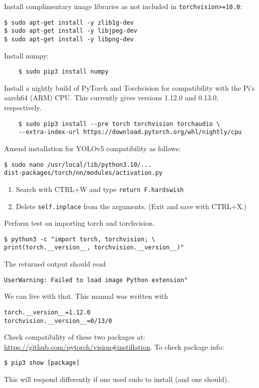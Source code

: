 \documentclass[12pt, a4paper, oneside]{article}
\begin{document}
Install complimentary image libraries as not included in \texttt{torchvision>=10.0}:
\begin{verbatim}
$ sudo apt-get install -y zlib1g-dev
$ sudo apt-get install -y libjpeg-dev
$ sudo apt-get install -y libpng-dev
\end{verbatim}
Install numpy:
\begin{verbatim}
	$ sudo pip3 install numpy
\end{verbatim}
Install a nightly build of PyTorch and Torchvision for compatibility with the Pi's aarch64 (ARM) CPU. This currently gives versions 1.12.0 and 0.13.0, respectively.
\begin{verbatim}
	$ sudo pip3 install --pre torch torchvision torchaudio \
	--extra-index-url https://download.pytorch.org/whl/nightly/cpu
\end{verbatim}
Amend installation for YOLOv5 compatibility as follows:
\begin{verbatim}
$ sudo nano /usr/local/lib/python3.10/...
dist-packages/torch/nn/modules/activation.py
\end{verbatim}
\begin{enumerate}
\item
Search with CTRL+W and type \texttt{return F.hardswish}
\item
Delete \texttt{self.inplace} from the arguments. (Exit and save with CTRL+X.)
\end{enumerate}
Perform test on importing torch and torchvision.
\begin{verbatim}
$ python3 -c "import torch, torchvision; \
print(torch.__version__, torchvision.__version__)"
\end{verbatim}
The returned output should read
\begin{verbatim}
UserWarning: Failed to load image Python extension"
\end{verbatim}
We can live with that. This manual was written with
\begin{verbatim}
torch.__version__=1.12.0
torchvision.__version__=0/13/0
\end{verbatim}
Check compatibility of these two packages at: \url{https://github.com/pytorch/vision#instillation}.
To check package info:
\begin{verbatim}
$ pip3 show [package]
\end{verbatim}
This will respond differently if one used sudo to install (and one should).
\end{document}
